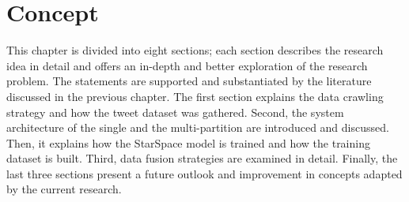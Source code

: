 \chapter{Concept}

This chapter is divided into eight sections; each section describes the research idea in detail and offers an in-depth and better exploration of the research problem. The statements are supported and substantiated by the literature discussed in the previous chapter. The first section explains the data crawling strategy and how the tweet dataset was gathered. Second, the system architecture of the single and the multi-partition are introduced and discussed. Then, it explains how the StarSpace model is trained and how the training dataset is built. Third, data fusion strategies are examined in detail. Finally, the last three sections present a future outlook and improvement in concepts adapted by the current research.
